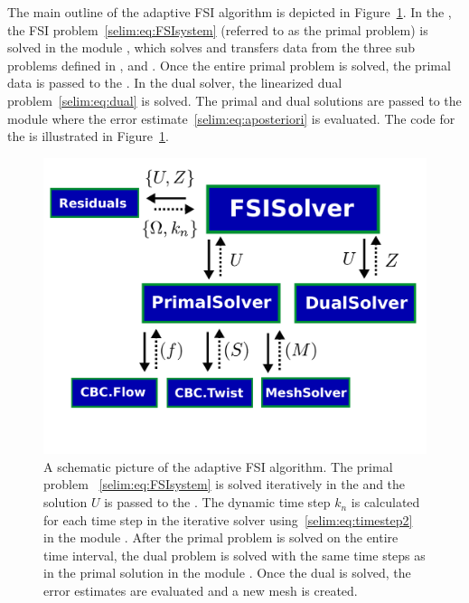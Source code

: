 The main outline of the adaptive FSI algorithm is depicted in
Figure~\ref{selim:fig:adaptiveMAP}. In the , the FSI
problem~\eqref{selim:eq:FSIsystem} (referred to as the primal problem)
is solved in the module , which solves and
transfers data from the three sub problems defined in
,  and . Once
the entire primal problem is solved, the primal data is passed to the
. In the dual solver, the linearized dual
problem~\eqref{selim:eq:dual} is solved. The primal and dual solutions
are passed to the module  where the error
estimate~\eqref{selim:eq:aposteriori} is evaluated. The code for the
 is illustrated in
Figure~\ref{selim:fig:adaptiveMAP}.
\begin{figure}
\label{selim:fig:adaptiveMAP}
\includegraphics[width=1.0\textwidth]{chapters/selim/pdf/adaptive.pdf}
\caption{A schematic picture of the adaptive FSI algorithm. The primal
  problem ~\eqref{selim:eq:FSIsystem} is solved iteratively in the
   and the solution $U$ is passed to the
  . The dynamic time step $k_n$ is calculated for
  each time step in the iterative solver 
  using~\eqref{selim:eq:timestep2} in the module
  . After the primal problem is solved on the entire
  time interval, the dual problem is solved with the same time steps
  as in the primal solution in the module . Once
  the dual is solved, the error estimates are evaluated and a new mesh
  is created.}
\end{figure}


